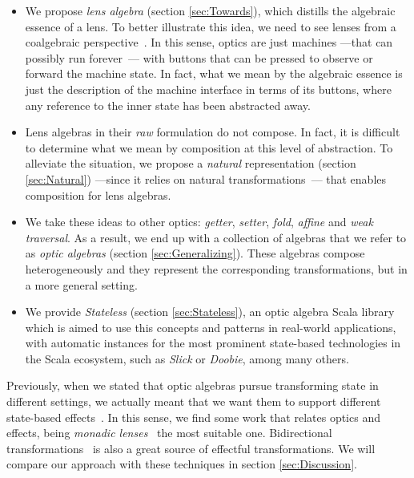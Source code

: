 \documentclass[final, twocolumn, 3p]{elsarticle}
\begin{document}
\begin{itemize}

\item We propose \emph{lens algebra} (section \ref{sec:Towards}), which distills
the algebraic essence of a lens. To better illustrate this idea, we need to see
lenses from a coalgebraic perspective~\cite{jacobs1995objects,
jacobs1997tutorial, oconnor2011functor}. In this sense, optics are just machines
---that can possibly run forever~\cite{turner2004total}--- with buttons that can
be pressed to observe or forward the machine state. In fact, what we mean by the
algebraic essence is just the description of the machine interface in terms of
its buttons, where any reference to the inner state has been abstracted away.

\item Lens algebras in their \emph{raw} formulation do not compose. In fact, it
is difficult to determine what we mean by composition at this level of
abstraction. To alleviate the situation, we propose a \emph{natural}
representation (section \ref{sec:Natural}) ---since it relies on natural
transformations~\cite{pierce1991basic}--- that enables composition for lens
algebras.

\item We take these ideas to other optics: \emph{getter}, \emph{setter},
\emph{fold}, \emph{affine} and \emph{weak traversal}. As a result, we end up
with a collection of algebras that we refer to as \emph{optic algebras} (section
\ref{sec:Generalizing}). These algebras compose heterogeneously and they
represent the corresponding transformations, but in a more general setting.

\item We provide \emph{Stateless} (section \ref{sec:Stateless}), an optic algebra
Scala library which is aimed to use this concepts and patterns in real-world
applications, with automatic instances for the most prominent state-based
technologies in the Scala ecosystem, such as \emph{Slick} or \emph{Doobie},
among many others.

\end{itemize}

Previously, when we stated that optic algebras pursue transforming state in
different settings, we actually meant that we want them to support different
state-based effects~\cite{wadler1995monads}. In this sense, we find some work
that relates optics and effects, being \emph{monadic
lenses}~\cite{abou2016reflections} the most suitable one. Bidirectional
transformations~\cite{abou2015notions, abou2017coalgebraic} is also a great
source of effectful transformations. We will compare our approach with these
techniques in section \ref{sec:Discussion}.
\end{document}

